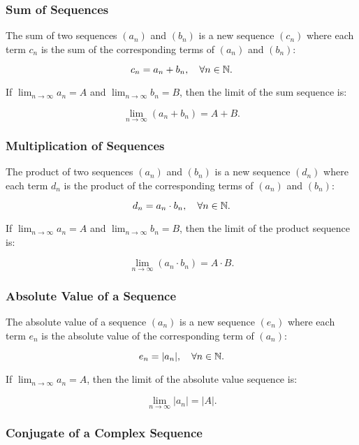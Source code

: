 \subsubsection{Sum of Sequences}

The sum of two sequences \((a_n)\) and \((b_n)\) is a new sequence \((c_n)\) where each term 
\(c_n\) is the sum of the corresponding terms of \((a_n)\) and \((b_n)\):

\[
    c_n = a_n + b_n, \quad \forall n \in \mathbb{N}.
\]

If \(\lim_{n \to \infty} a_n = A\) and \(\lim_{n \to \infty} b_n = B\), then the limit of the sum sequence is:

\[
    \lim_{n \to \infty} (a_n + b_n) = A + B.
\]

\subsubsection{Multiplication of Sequences}

The product of two sequences \((a_n)\) and \((b_n)\) is a new sequence \((d_n)\) where each term \(d_n\) 
is the product of the corresponding terms of \((a_n)\) and \((b_n)\):

\[
    d_n = a_n \cdot b_n, \quad \forall n \in \mathbb{N}.
\]

If \(\lim_{n \to \infty} a_n = A\) and \(\lim_{n \to \infty} b_n = B\), then the limit of the product sequence is:

\[
    \lim_{n \to \infty} (a_n \cdot b_n) = A \cdot B.
\]

\subsubsection{Absolute Value of a Sequence}

The absolute value of a sequence \((a_n)\) is a new sequence \((e_n)\) where each term \(e_n\) is the absolute value of the corresponding term of \((a_n)\):

\[
    e_n = |a_n|, \quad \forall n \in \mathbb{N}.
\]

If \(\lim_{n \to \infty} a_n = A\), then the limit of the absolute value sequence is:

\[
    \lim_{n \to \infty} |a_n| = |A|.
\]

\subsubsection{Conjugate of a Complex Sequence}

